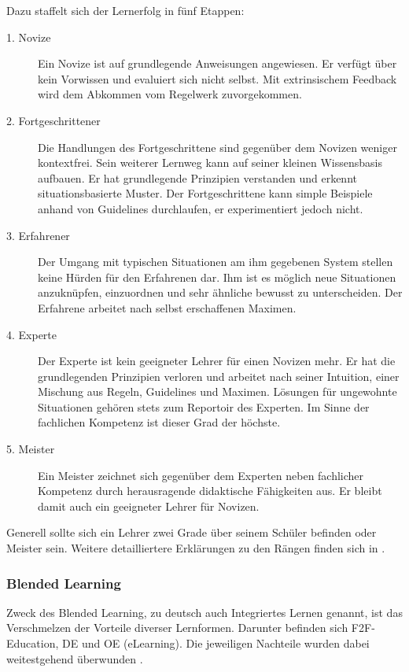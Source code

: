 Dazu staffelt sich der Lernerfolg in fünf Etappen:
\begin{description}
  \item[1. Novize] Ein Novize ist auf grundlegende Anweisungen angewiesen. Er
  verfügt über kein Vorwissen und evaluiert sich nicht selbst. Mit extrinsischem
  Feedback wird dem Abkommen vom Regelwerk zuvorgekommen.
  \item[2. Fortgeschrittener] Die Handlungen des Fortgeschrittene sind gegenüber
  dem Novizen weniger kontextfrei. Sein weiterer Lernweg kann auf seiner kleinen
  Wissensbasis aufbauen. Er hat grundlegende Prinzipien verstanden und erkennt
  situationsbasierte Muster. Der Fortgeschrittene kann simple Beispiele anhand
  von Guidelines durchlaufen, er experimentiert jedoch nicht.
  \item[3. Erfahrener] Der Umgang mit typischen Situationen am ihm gegebenen
  System stellen keine Hürden für den Erfahrenen dar. Ihm ist es möglich neue
  Situationen anzuknüpfen, einzuordnen und sehr ähnliche bewusst zu
  unterscheiden. Der Erfahrene arbeitet nach selbst erschaffenen Maximen.
  \item[4. Experte] Der Experte ist kein geeigneter Lehrer für einen Novizen
  mehr. Er hat die grundlegenden Prinzipien verloren und arbeitet nach seiner
  Intuition, einer Mischung aus Regeln, Guidelines und Maximen. Lösungen für
  ungewohnte Situationen gehören stets zum Reportoir des Experten. Im Sinne der
  fachlichen Kompetenz ist dieser Grad der höchste.
  \item[5. Meister] Ein Meister zeichnet sich gegenüber dem Experten neben
  fachlicher Kompetenz durch herausragende didaktische Fähigkeiten aus. Er
  bleibt damit auch ein geeigneter Lehrer für Novizen.
\end{description}

Generell sollte sich ein Lehrer zwei Grade über seinem Schüler befinden oder
Meister sein. Weitere detailliertere Erklärungen zu den Rängen finden sich in
\cite{gruben:2012}.

\subsubsection{Blended Learning}\label{ref:blendedLearning}
Zweck des Blended Learning, zu deutsch auch Integriertes Lernen genannt, ist das
Verschmelzen der Vorteile diverser Lernformen. Darunter befinden sich
\ac{F2F}-Education, \ac{DE} und \ac{OE} (eLearning). Die jeweiligen Nachteile
wurden dabei weitestgehend überwunden \cite{kroeger:2004}.

